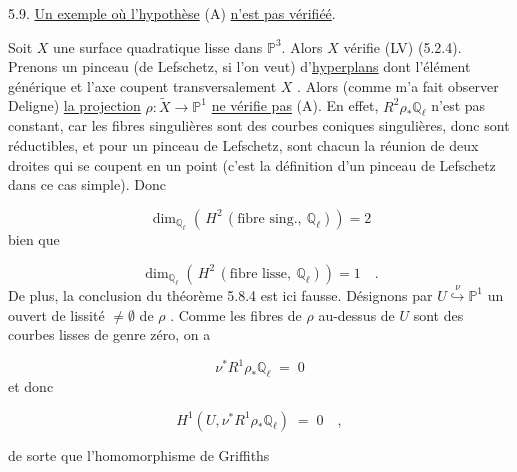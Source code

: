 5.9. \underline{Un exemple où l'hypothèse} (A) \underline{n'est pas vérifiéé}.

Soit $X$ une surface quadratique lisse dans $\mathbb{P}^3$. Alors $X$ vérifie (LV) (5.2.4). Prenons un pinceau (de Lefschetz, si l'on veut) d'\underline{hyperplans} dont l'élément générique et l'axe coupent transversalement $X$ . Alors (comme m'a fait observer Deligne) \underline{la projection} $\rho : \widetilde{X} \longrightarrow \mathbb{P}^1$ \underline{ne vérifie pas} (A). En effet, $R^2\rho_*\mathbb{Q}_\ell$ n'est pas constant, car les fibres singulières sont des courbes coniques singulières, donc sont réductibles, et pour un pinceau de Lefschetz, sont chacun la réunion de deux droites qui se coupent en un point (c'est la définition d'un pinceau de Lefschetz dans ce cas simple). Donc

\begin{equation*}
\dim_{\mathbb{Q}_\ell}\left(\, H^2\,(\text{fibre sing.},\ \mathbb{Q}_\ell)\right) = 2
\end{equation*}
bien que

\begin{equation*}
\dim_{\mathbb{Q}_\ell}\left(\, H^2\,(\text{fibre lisse},\ \mathbb{Q}_\ell)\right) = 1 \quad .
\end{equation*}
De plus, la conclusion du théorème 5.8.4 est ici fausse. Désignons par $U \stackrel{\nu}{\hookrightarrow} \mathbb{P}^1$ un ouvert de lissité $\neq \emptyset$ de $\rho$ . Comme les fibres de $\rho$ au-dessus de $U$ sont des courbes lisses de genre zéro, on a

\begin{equation*}
\nu^*R^1\rho_*\mathbb{Q}_\ell \;=\; 0
\end{equation*}
et donc

\begin{equation*}
H^1(U,\nu^*R^1\rho_*\mathbb{Q}_\ell) \;=\; 0 \quad , 
\end{equation*}


%
%
de sorte que l'homomorphisme de Griffiths

